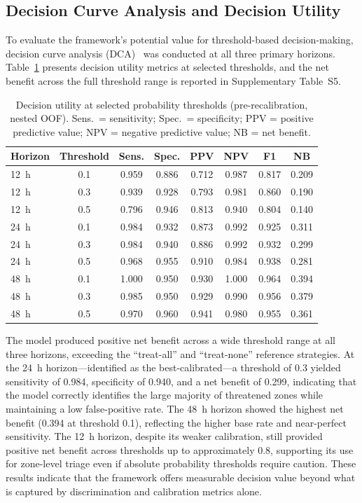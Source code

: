 \documentclass[fire,article,submit,pdftex]{../Definitions/mdpi}
\begin{document}
\subsection{Decision Curve Analysis and Decision Utility}\label{sec:dca_results}

To evaluate the framework's potential value for threshold-based decision-making, decision curve analysis (DCA)~\cite{Vickers2006} was conducted at all three primary horizons.
Table~\ref{tab:dca_utility} presents decision utility metrics at selected thresholds, and the net benefit across the full threshold range is reported in Supplementary Table~S5.

\begin{table}[!ht]
\caption{Decision utility at selected probability thresholds (pre-recalibration, nested OOF). Sens.\ = sensitivity; Spec.\ = specificity; PPV = positive predictive value; NPV = negative predictive value; NB = net benefit.}\label{tab:dca_utility}
\small
\begin{tabular}{lccccccc}
\toprule
\textbf{Horizon} & \textbf{Threshold} & \textbf{Sens.} & \textbf{Spec.} & \textbf{PPV} & \textbf{NPV} & \textbf{F1} & \textbf{NB} \\
\midrule
12~h & 0.1 & 0.959 & 0.886 & 0.712 & 0.987 & 0.817 & 0.209 \\
12~h & 0.3 & 0.939 & 0.928 & 0.793 & 0.981 & 0.860 & 0.190 \\
12~h & 0.5 & 0.796 & 0.946 & 0.813 & 0.940 & 0.804 & 0.140 \\
\midrule
24~h & 0.1 & 0.984 & 0.932 & 0.873 & 0.992 & 0.925 & 0.311 \\
24~h & 0.3 & 0.984 & 0.940 & 0.886 & 0.992 & 0.932 & 0.299 \\
24~h & 0.5 & 0.968 & 0.955 & 0.910 & 0.984 & 0.938 & 0.281 \\
\midrule
48~h & 0.1 & 1.000 & 0.950 & 0.930 & 1.000 & 0.964 & 0.394 \\
48~h & 0.3 & 0.985 & 0.950 & 0.929 & 0.990 & 0.956 & 0.379 \\
48~h & 0.5 & 0.970 & 0.960 & 0.941 & 0.980 & 0.955 & 0.361 \\
\bottomrule
\end{tabular}
\end{table}

The model produced positive net benefit across a wide threshold range at all three horizons, exceeding the ``treat-all'' and ``treat-none'' reference strategies.
At the 24~h horizon---identified as the best-calibrated---a threshold of 0.3 yielded sensitivity of 0.984, specificity of 0.940, and a net benefit of 0.299, indicating that the model correctly identifies the large majority of threatened zones while maintaining a low false-positive rate.
The 48~h horizon showed the highest net benefit (0.394 at threshold 0.1), reflecting the higher base rate and near-perfect sensitivity.
The 12~h horizon, despite its weaker calibration, still provided positive net benefit across thresholds up to approximately 0.8, supporting its use for zone-level triage even if absolute probability thresholds require caution.
These results indicate that the framework offers measurable decision value beyond what is captured by discrimination and calibration metrics alone.
\end{document}
